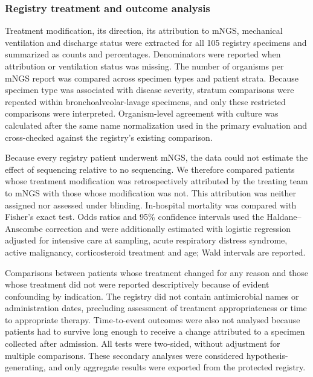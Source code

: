 \documentclass[11pt,a4paper]{article}
\newcommand{\mngs}{mNGS\xspace}
\begin{document}
\subsubsection*{Registry treatment and outcome analysis}
Treatment modification, its direction, its attribution to \mngs, mechanical ventilation and discharge status were extracted for all 105 registry specimens and summarized as counts and percentages. Denominators were reported when attribution or ventilation status was missing. The number of organisms per \mngs report was compared across specimen types and patient strata. Because specimen type was associated with disease severity, stratum comparisons were repeated within bronchoalveolar-lavage specimens, and only these restricted comparisons were interpreted. Organism-level agreement with culture was calculated after the same name normalization used in the primary evaluation and cross-checked against the registry's existing comparison.

Because every registry patient underwent \mngs, the data could not estimate the effect of sequencing relative to no sequencing. We therefore compared patients whose treatment modification was retrospectively attributed by the treating team to \mngs with those whose modification was not. This attribution was neither assigned nor assessed under blinding. In-hospital mortality was compared with Fisher's exact test. Odds ratios and 95\% confidence intervals used the Haldane--Anscombe correction and were additionally estimated with logistic regression adjusted for intensive care at sampling, acute respiratory distress syndrome, active malignancy, corticosteroid treatment and age; Wald intervals are reported.

Comparisons between patients whose treatment changed for any reason and those whose treatment did not were reported descriptively because of evident confounding by indication. The registry did not contain antimicrobial names or administration dates, precluding assessment of treatment appropriateness or time to appropriate therapy. Time-to-event outcomes were also not analysed because patients had to survive long enough to receive a change attributed to a specimen collected after admission. All tests were two-sided, without adjustment for multiple comparisons. These secondary analyses were considered hypothesis-generating, and only aggregate results were exported from the protected registry.
\end{document}
